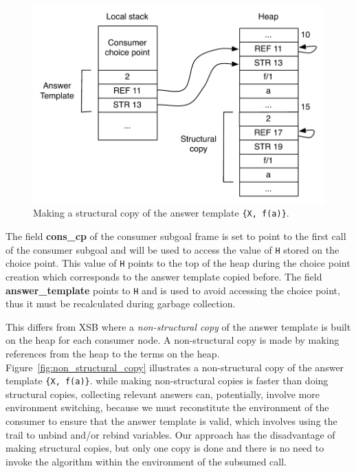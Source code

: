 \begin{figure}[H]
  \centering
    \includegraphics[scale=0.6]{structural_copy.pdf}
  \caption{Making a structural copy of the answer template \texttt{\{X,~f(a)\}}.}
  \label{fig:structural_copy}
\end{figure}

The field \textbf{cons\_cp} of the consumer subgoal frame is set to point to the first call
of the consumer subgoal and will be used to access the value of \texttt{H} stored on the choice point.
This value of \texttt{H} points to the top of the heap during the choice point creation which corresponds
to the answer template copied before. The field \textbf{answer\_template} points to \texttt{H}
and is used to avoid accessing the choice point, thus it must be recalculated during garbage collection.

This differs from XSB \cite{Johnson-00} where a \textit{non-structural copy} of the answer template
is built on the heap for each consumer node. A non-structural copy is made by making references from
the heap to the terms on the heap. Figure~\ref{fig:non_structural_copy} illustrates a non-structural
copy of the answer template \texttt{\{X,~f(a)\}}. 
while making non-structural copies is faster than doing structural copies, collecting relevant answers
can, potentially, involve more environment switching, because we must reconstitute the environment of
the consumer to ensure that the answer template is valid, which involves using the trail to unbind
and/or rebind variables. Our approach has the disadvantage of making structural copies, but only one
copy is done and there is no need to invoke the algorithm within the environment of the subsumed call.

